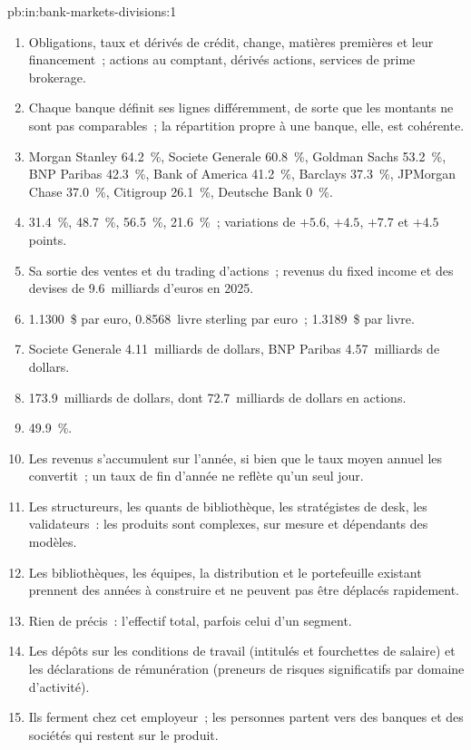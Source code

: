 \begin{solution}{pb:in:bank-markets-divisions:1}
\begin{enumerate}
\item Obligations, taux et dérivés de crédit, change, matières premières et leur financement~; actions au comptant, dérivés actions,
services de prime brokerage.
\item Chaque banque définit ses lignes différemment, de sorte que les montants ne sont pas comparables~; la répartition propre à une banque, elle, est cohérente.
\item Morgan Stanley 64.2~\%, Societe Generale 60.8~\%, Goldman Sachs 53.2~\%, BNP Paribas 42.3~\%, Bank of America 41.2~\%,
Barclays 37.3~\%, JPMorgan Chase 37.0~\%, Citigroup 26.1~\%, Deutsche Bank 0~\%.
\item 31.4~\%, 48.7~\%, 56.5~\%, 21.6~\%~; variations de $+5.6$, $+4.5$, $+7.7$ et $+4.5$ points.
\item Sa sortie des ventes et du trading d'actions~; revenus du fixed income et des devises de 9.6~milliards d'euros en 2025.
\item 1.1300~\$ par euro, 0.8568~livre sterling par euro~; 1.3189~\$ par livre.
\item Societe Generale 4.11~milliards de dollars, BNP Paribas 4.57~milliards de dollars.
\item 173.9~milliards de dollars, dont 72.7~milliards de dollars en actions.
\item 49.9~\%.
\item Les revenus s'accumulent sur l'année, si bien que le taux moyen annuel les convertit~; un taux de fin d'année ne reflète qu'un seul jour.
\item Les structureurs, les quants de bibliothèque, les stratégistes de desk, les validateurs~: les produits sont complexes, sur mesure et dépendants des modèles.
\item Les bibliothèques, les équipes, la distribution et le portefeuille existant prennent des années à construire et ne peuvent pas être déplacés rapidement.
\item Rien de précis~: l'effectif total, parfois celui d'un segment.
\item Les dépôts sur les conditions de travail (intitulés et fourchettes de salaire) et les déclarations de rémunération (preneurs de risques significatifs par domaine d'activité).
\item Ils ferment chez cet employeur~; les personnes partent vers des banques et des sociétés qui restent sur le produit.

\end{enumerate}
\end{solution}
